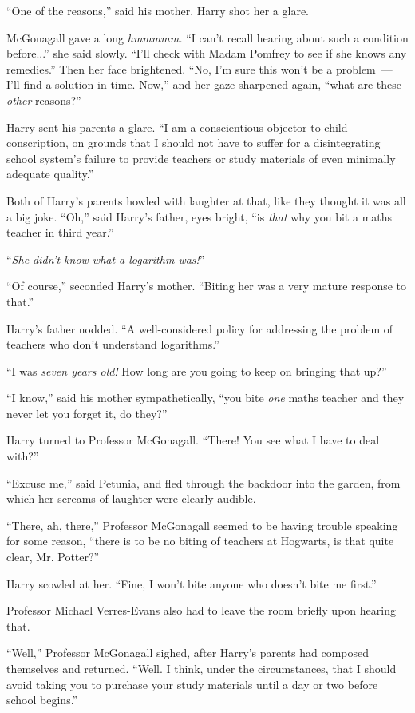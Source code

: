 ``One of the reasons,'' said his mother. Harry shot her a glare.

McGonagall gave a long \emph{hmmmmm.} ``I can't recall hearing about such a condition before...'' she said slowly. ``I'll check with Madam Pomfrey to see if she knows any remedies.'' Then her face brightened. ``No, I'm sure this won't be a problem~--- I'll find a solution in time. Now,'' and her gaze sharpened again, ``what are these \emph{other} reasons?''

Harry sent his parents a glare. ``I am a conscientious objector to child conscription, on grounds that I should not have to suffer for a disintegrating school system's failure to provide teachers or study materials of even minimally adequate quality.''

Both of Harry's parents howled with laughter at that, like they thought it was all a big joke. ``Oh,'' said Harry's father, eyes bright, ``is \emph{that} why you bit a maths teacher in third year.''

``\emph{She didn't know what a logarithm was!}''

``Of course,'' seconded Harry's mother. ``Biting her was a very mature response to that.''

Harry's father nodded. ``A well-considered policy for addressing the problem of teachers who don't understand logarithms.''

``I was \emph{seven years old!} How long are you going to keep on bringing that up?''

``I know,'' said his mother sympathetically, ``you bite \emph{one} maths teacher and they never let you forget it, do they?''

Harry turned to Professor McGonagall. ``There! You see what I have to deal with?''

``Excuse me,'' said Petunia, and fled through the backdoor into the garden, from which her screams of laughter were clearly audible.

``There, ah, there,'' Professor McGonagall seemed to be having trouble speaking for some reason, ``there is to be no biting of teachers at Hogwarts, is that quite clear, Mr. Potter?''

Harry scowled at her. ``Fine, I won't bite anyone who doesn't bite me first.''

Professor Michael Verres-Evans also had to leave the room briefly upon hearing that.

``Well,'' Professor McGonagall sighed, after Harry's parents had composed themselves and returned. ``Well. I think, under the circumstances, that I should avoid taking you to purchase your study materials until a day or two before school begins.''

